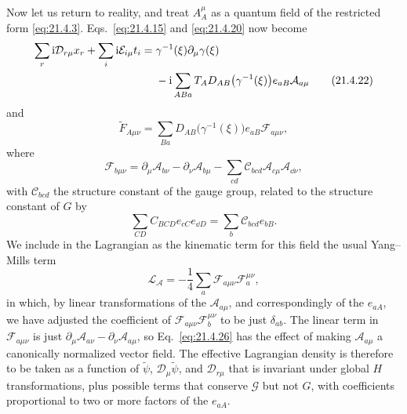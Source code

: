 Now let us return to reality, and treat $A_A^\mu$ as a quantum field of the restricted form \eqref{eq:21.4.3}. Eqs.~\eqref{eq:21.4.15} and \eqref{eq:21.4.20} now become
\begin{align}
\sum_r \mathrm{i}\mathcal D_{r\mu}x_r+\sum_i \mathrm{i}\mathcal E_{i\mu}t_i
={}&\gamma^{-1}(\xi)\partial_\mu\gamma(\xi)
\notag\\
&-\mathrm{i}\sum_{ABa}T_A
D_{AB}\bigl(\gamma^{-1}(\xi)\bigr)e_{a B}\mathcal A_{a\mu}
\tag{21.4.22}\label{eq:21.4.22}
\end{align}
and
\begin{equation}
\widetilde F_{A\mu\nu}
=\sum_{Ba}
D_{AB}\bigl(\gamma^{-1}(\xi)\bigr)e_{a B}
\mathcal F_{a\mu\nu},
\tag{21.4.23}\label{eq:21.4.23}
\end{equation}
where
\begin{equation}
\mathcal F_{b\mu\nu}
=\partial_\mu\mathcal A_{b\nu}
-\partial_\nu\mathcal A_{b\mu}
-\sum_{cd}
\mathcal C_{bcd}
\mathcal A_{c\mu}\mathcal A_{\dd\nu},
\tag{21.4.24}\label{eq:21.4.24}
\end{equation}
with $\mathcal C_{bcd}$ the structure constant of the gauge group, related to the structure constant of $G$ by
\begin{equation}
\sum_{CD}C_{BCD}e_{c C}e_{\dd D}
=\sum_b\mathcal C_{bcd}e_{b B}.
\tag{21.4.25}\label{eq:21.4.25}
\end{equation}
We include in the Lagrangian as the kinematic term for this field the usual Yang--Mills term
\begin{equation}
\mathcal L_{\mathcal A}
=-\frac{1}{4}\sum_a
\mathcal F_{a\mu\nu}\mathcal F_a^{\mu\nu},
\tag{21.4.26}\label{eq:21.4.26}
\end{equation}
in which, by linear transformations of the $\mathcal A_{a\mu}$, and correspondingly of the $e_{a A}$, we have adjusted the coefficient of $\mathcal F_{a\mu\nu}\mathcal F_b^{\mu\nu}$ to be just $\delta_{ab}$. The linear term in $\mathcal F_{a\mu\nu}$ is just $\partial_\mu\mathcal A_{a\nu}-\partial_\nu\mathcal A_{a\mu}$, so Eq.~\eqref{eq:21.4.26} has the effect of making $\mathcal A_{a\mu}$ a canonically normalized vector field. The effective Lagrangian density is therefore to be taken as a function of $\widetilde\psi$, $\mathcal D_\mu\widetilde\psi$, and $\mathcal D_{r\mu}$ that is invariant under global $H$ transformations, plus possible terms that conserve $\mathcal G$ but not $G$, with coefficients proportional to two or more factors of the $e_{a A}$.

